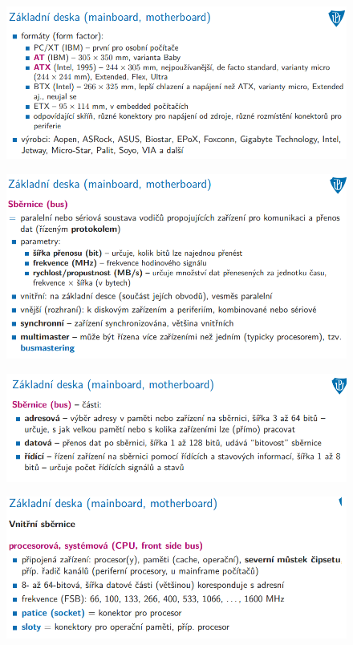 \documentclass[10pt,a4paper]{article}
\begin{document}
\begin{figure} [h]
	\includegraphics[scale=0.65]{img/prvni_odstavec/otazka4/zakladni_deska3.png}	
\end{figure}

\begin{figure} [h]
	\includegraphics[scale=0.65]{img/prvni_odstavec/otazka4/zakladni_deska4.png}	
\end{figure}

\begin{figure} [h]
	\includegraphics[scale=0.65]{img/prvni_odstavec/otazka4/zakladni_deska5.png}	
\end{figure}

\begin{figure} [h]
	\includegraphics[scale=0.65]{img/prvni_odstavec/otazka4/zakladni_deska6.png}	
\end{figure}
\end{document}
